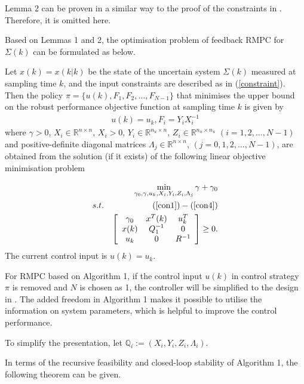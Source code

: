 \documentclass{singlecol-new}
\theoremstyle{TH}{
\newtheorem{lemma}{Lemma}
\newtheorem{theorem}[lemma]{Theorem}
\newtheorem{corrolary}[lemma]{Corrolary}
\newtheorem{conjecture}[lemma]{Conjecture}
\newtheorem{proposition}[lemma]{Proposition}
\newtheorem{claim}[lemma]{Claim}
\newtheorem{stheorem}[lemma]{Wrong Theorem}
\newtheorem{algorithm}{Algorithm}
}
\theoremstyle{THrm}{
\newtheorem{definition}{Definition}[section]
\newtheorem{question}{Question}[section]
\newtheorem{remark}{Remark}
\newtheorem{scheme}{Scheme}
}
\theoremstyle{THhit}{
\newtheorem{case}{Case}[section]
}
\begin{document}
\noindent Lemma 2 can be proven in a similar way to the proof of the
constraints in \cite{Kothare}. Therefore, it is omitted here.

Based on Lemmas 1 and 2, the optimisation problem of feedback RMPC
for $\Sigma (k)$ can be formulated as below.

\begin{algorithm}
Let $x(k) = x(k|k)$ be the state of the uncertain system  $\Sigma
(k)$ measured at sampling time $k$, and the input constraints are
described as in {\rm (\ref{constraint})}. Then the policy $\pi  = \{
u(k),F_1 ,F_2 , \ldots ,F_{N - 1} \} $ that minimises the upper
bound on the robust performance objective function at sampling time
$k$ is given by
\begin{eqnarray*}
u(k)=u_k,F_i  = Y_i X_i^{ - 1}
\end{eqnarray*}
where $\gamma  > 0$, $X_i  \in \mathbb{R}^{n \times n} $, $X_i  >
0$, $Y_i \in \mathbb{R}^{n_u  \times n} $, $Z_i \in \mathbb{R}^{n_u
\times n_u} $ $(i = 1,2, \ldots ,N - 1)$ and positive-definite
diagonal matrices $\Lambda _j \in \mathbb{R}^{n \times n}$, $(j =
0,1,2, \ldots, N - 1)$, are obtained from the solution (if it
exists) of the following linear objective minimisation problem

\begin{eqnarray}\label{controller1}
&&\mathop {\min }\limits_{\gamma_0 ,\gamma,u_k ,X_i ,Y_i
,Z_i,\Lambda_j } {\mathbf{   }} \gamma  + \gamma _0  \\
s.t.&& \qquad (\ref{con1})-(\ref{con4})\\&&
\label{controller2}\left[ {\begin{array}{ccc}
   {\gamma _0 } & {x^T (k)} & {u_k^T }  \\
   {x(k)} & {Q_1^{-1} } & 0  \\
   {u_k } & 0 & R^{-1}  \\
\end{array}} \right] \ge 0.
\end{eqnarray}
The current control input is $u(k)=u_k$.
\end{algorithm}

\begin{remark}
For RMPC based on Algorithm 1, if the control input $u(k)$ in
control strategy $\pi$ is removed and $N$ is chosen as 1, the
controller will be simplified to the design in \cite{Kothare}. The
added freedom in Algorithm 1 makes it possible to utilise the
information on system parameters, which is helpful to improve the
control performance.

\noindent To simplify the presentation, let $\mathbb{Q}_i:=(X_i
,Y_i,Z_i,\Lambda _i)$.

In terms of the recursive feasibility and closed-loop stability of
Algorithm 1, the following theorem can be given.
\end{remark}
\end{document}
